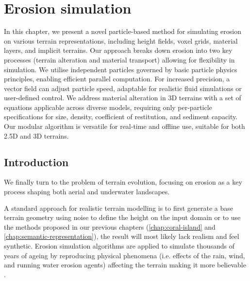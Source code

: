 \chapter{Erosion simulation}
\label{chap:erosion}


\abstract




In this chapter, we present a novel particle-based method for simulating erosion on various terrain representations, including height fields, voxel grids, material layers, and implicit terrains. Our approach breaks down erosion into two key processes (terrain alteration and material transport) allowing for flexibility in simulation. We utilise independent particles governed by basic particle physics principles, enabling efficient parallel computation. For increased precision, a vector field can adjust particle speed, adaptable for realistic fluid simulations or user-defined control. We address material alteration in 3D terrains with a set of equations applicable across diverse models, requiring only per-particle specifications for size, density, coefficient of restitution, and sediment capacity. Our modular algorithm is versatile for real-time and offline use, suitable for both 2.5D and 3D terrains.
\pagebreak

\minitoc

\section{Introduction}
We finally turn to the problem of terrain evolution, focusing on erosion as a key process shaping both aerial and underwater landscapes. 

A standard approach for realistic terrain modelling is to first generate a base terrain geometry using noise to define the height on the input domain \cite{Musgrave1989, Olsen2004, Roudier1993} or to use the methods proposed in our previous chapters (\cref{chap:coral-island} and \cref{chap:semantic-representation}), the result will most likely lack realism and feel synthetic. Erosion simulation algorithms are applied to simulate thousands of years of ageing by reproducing physical phenomena (i.e. effects of the rain, wind, and running water erosion agents) affecting the terrain making it more believable \cite{Stachniak2005, Smelik2009, Galin2019}.

